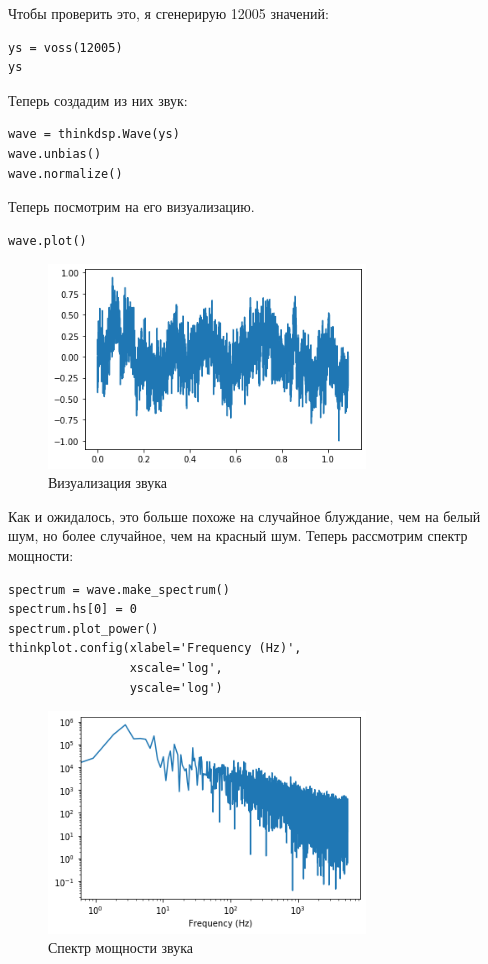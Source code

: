 \documentclass[a4paper,12pt]{report}
\begin{document}
Чтобы проверить это, я сгенерирую 12005 значений:

\begin{lstlisting}[caption=Генерация значений]
ys = voss(12005)
ys
\end{lstlisting}

Теперь создадим из них звук:

\begin{lstlisting}[caption=Создание звука]
wave = thinkdsp.Wave(ys)
wave.unbias()
wave.normalize()
\end{lstlisting}

Теперь посмотрим на его визуализацию.

\begin{lstlisting}[caption=Визуализация звука]
wave.plot()
\end{lstlisting}

\begin{figure}[H]
        \centering
        \includegraphics[width=0.75\textwidth]{lab4_fig5_1.png}
        \caption{Визуализация звука}
        \label{fig:lab4_fig5_1}
\end{figure}

Как и ожидалось, это больше похоже на случайное блуждание, чем на белый шум, но более случайное, чем на красный шум. Теперь рассмотрим спектр мощности:

\begin{lstlisting}[caption=Спектр мощности звука]
spectrum = wave.make_spectrum()
spectrum.hs[0] = 0
spectrum.plot_power()
thinkplot.config(xlabel='Frequency (Hz)',
                 xscale='log', 
                 yscale='log')
\end{lstlisting}

\begin{figure}[H]
        \centering
        \includegraphics[width=0.75\textwidth]{lab4_fig5_2.png}
        \caption{Спектр мощности звука}
        \label{fig:lab4_fig5_2}
\end{figure}
\end{document}
